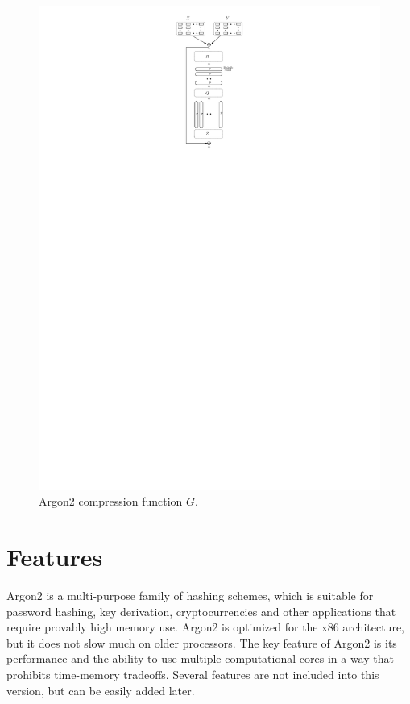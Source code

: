 \documentclass[a4paper]{article}
\begin{document}
  \begin{figure}[ht]
  \ifpdf
\begin{center}
  \includegraphics[scale=0.6]{pics/compression.pdf}
  \caption{Argon2 compression function $G$. }\label{fig:compression}
\end{center}
\fi
  \end{figure}
  
  \section{Features}

\textsf{Argon2} is a multi-purpose family of  hashing schemes, which is suitable for password hashing, key derivation, cryptocurrencies and other applications that require provably high memory use. \textsf{Argon2} is optimized for the x86 architecture, but it does not slow much on older processors. The key feature of \textsf{Argon2} is its performance and the ability to use multiple computational cores in a way that prohibits time-memory tradeoffs. Several features are not included into this version, but can be easily added later.
\end{document}
